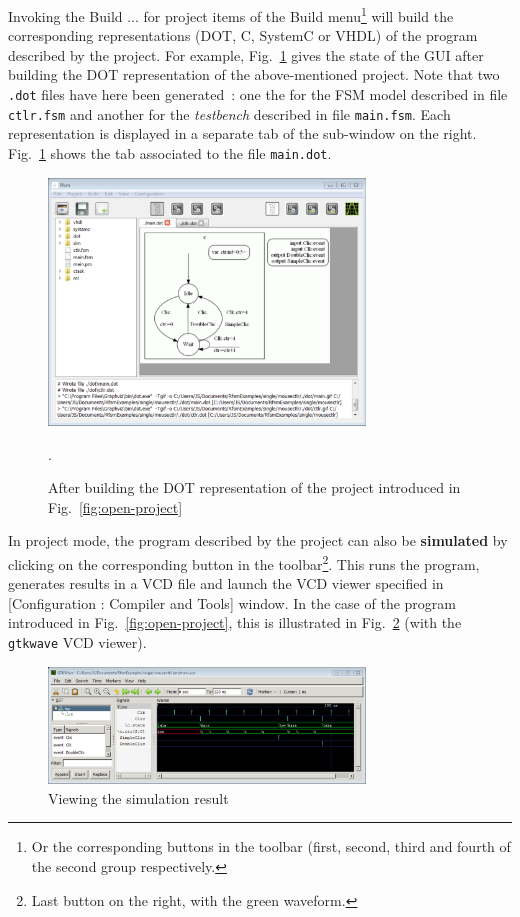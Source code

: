 Invoking the \textsf{Build ... for project} items of the \textsf{Build} menu\footnote{Or the
  corresponding buttons in the toolbar (first, second, third and fourth of the second group
  respectively.} will build the corresponding representations (DOT, C, SystemC or VHDL) of the
program described by the project.  For example, Fig.~\ref{fig:make-dot-project} gives the state of
the GUI after building the DOT representation of the above-mentioned project. Note that two
\verb|.dot| files have here been generated~: one the for the FSM model described in file
\verb|ctlr.fsm| and another for the \emph{testbench} described in file \verb|main.fsm|. Each
representation is displayed in a separate tab of the sub-window on the
right. Fig.~\ref{fig:make-dot-project} shows the tab associated to the file \verb|main.dot|. 

\begin{figure}[h]
  \centering
  \includegraphics[width=0.75\textwidth]{figs/gui/make-dot-project}
  \caption{After building the DOT representation of the project introduced in
    Fig.~\ref{fig:open-project}}.
  \label{fig:make-dot-project}
\end{figure}


\medskip
In project mode, the program described by the project can also be \textbf{simulated} by clicking on
the corresponding button in the toolbar\footnote{Last button on the right, with the green
  waveform.}. This runs the program, generates results in a VCD file and launch the VCD viewer specified in 
  [\textsf{Configuration : Compiler and Tools}] window. In the case of the program introduced in
  Fig.~\ref{fig:open-project}, this is illustrated in Fig.~\ref{fig:make-sim} (with the
  \verb|gtkwave| VCD viewer).

\begin{figure}[h]
  \centering
  \includegraphics[width=0.75\textwidth]{figs/gui/make-sim}
  \caption{Viewing the simulation result}
  \label{fig:make-sim}
\end{figure}


